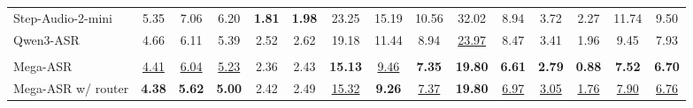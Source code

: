 \documentclass{llmxive}
\begin{document}
\begin{table}[t]
\begin{tabular}{lcccccccccccccc}
Step-Audio-2-mini &
5.35 &
7.06 &
6.20 &
\textbf{1.81} &
\textbf{1.98} &
23.25 &
15.19 &
10.56 &
32.02 &
8.94 &
3.72 &
2.27 &
11.74 &
9.50 \\
Qwen3-ASR &
4.66 &
6.11 &
5.39 &
2.52 &
2.62 &
19.18 &
11.44 &
8.94 &
\underline{23.97} &
8.47 &
3.41 &
1.96 &
9.45 &
7.93 \\
\rowcolor{headerblue}
\multicolumn{15}{l}{\textit{Our model}} \\
Mega-ASR &
\underline{4.41} &
\underline{6.04} &
\underline{5.23} &
2.36 &
2.43 &
\textbf{15.13} &
\underline{9.46} &
\textbf{7.35} &
\textbf{19.80} &
\textbf{6.61} &
\textbf{2.79} &
\textbf{0.88} &
\textbf{7.52} &
\textbf{6.70} \\
Mega-ASR w/ router &
\textbf{4.38} &
\textbf{5.62} &
\textbf{5.00} &
2.42 &
2.49 &
\underline{15.32} &
\textbf{9.26} &
\underline{7.37} &
\textbf{19.80} &
\underline{6.97} &
\underline{3.05} &
\underline{1.76} &
\underline{7.90} &
\underline{6.76} \\
\bottomrule
\end{tabular}











\end{table}
\end{document}
